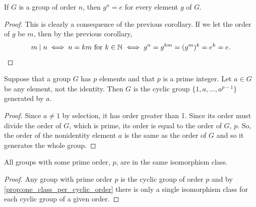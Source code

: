 \documentclass[MathsNotesBase.tex]{subfiles}
\begin{document}
{		\begin{corollary}
			\label{coro:group_order_n_nth_power_of_elements_is_identity}
			If $ G $ is a group of order $ n $, then ${ g^n = e }$ for every element $ g $ of $ G $.
		\end{corollary}
		\begin{proof}
			This is clearly a consequence of the previous corollary. If we let the order of $g$ be $m$, then by the previous corollary, 
			\[ m \mid n \iff n = km \text{ for } k \in \mathbb{N}^{} \iff g^n = g^{km} = (g^m)^k = e^k = e. \qedhere \]
		\end{proof}
	
		\begin{corollary}
			\label{coro:prime_order_groups_are_cyclic}
			Suppose that a group $G$ has $p$ elements and that $p$ is a prime integer. Let $a \in G$ be any element, not the identity. Then $G$ is the cyclic group $\{1, a, \dots , a^{p-1}\}$ generated by $a$.
		\end{corollary}
		\begin{proof}
			Since $a \neq 1$ by selection, it has order greater than 1. Since its order must divide the order of $G$, which is prime, its order is equal to the order of $G$, $p$. So, the order of the nonidentity element $a$ is the same as the order of $G$ and so it generates the whole group.
		\end{proof}
	
		\begin{corollary}
			All groups with some prime order, $p$, are in the same isomorphism class.
		\end{corollary}
		\begin{proof}
			Any group with prime order $p$ is the cyclic group of order $p$ and by \autoref{prop:one_class_per_cyclic_order} there is only a single isomorphism class for each cyclic group of a given order.
		\end{proof}
	
}
\end{document}
